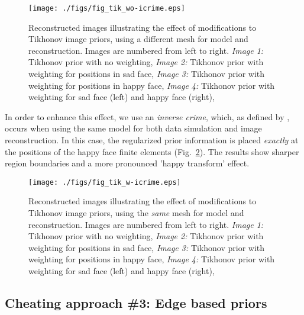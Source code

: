 \documentclass[12pt]{iopart}
\begin{document}
%
%
\begin{figure}[th]
\begin{flushright}
\texttt{[image: ./figs/fig\_tik\_wo-icrime.eps]}
\caption{\small 
Reconstructed images illustrating the effect of modifications
to Tikhonov image priors,
using a different mesh for model and reconstruction.
Images are numbered from left to right.
{\em Image 1:} Tikhonov prior with no weighting,
{\em Image 2:} Tikhonov prior with weighting for positions in sad face,
{\em Image 3:} Tikhonov prior with weighting for positions in happy face,
{\em Image 4:} Tikhonov prior with weighting for sad face (left) and
happy face (right),
 }
 \label{fig:tikprior}
\end{flushright}
\end{figure}

In order to enhance this effect, we use an {\em inverse crime},
which, as defined by \cite{Colton_and_Kress_1992}, occurs when
using the same model for both data simulation and image reconstruction.
In this case, the regularized prior information is placed
{\em exactly} at the positions of the happy face finite elements
(Fig.~\ref{fig:tikprior_icrime}). The results show sharper region boundaries
and a more pronounced 'happy transform' effect.

%
%
\begin{figure}[th]
\begin{flushright}
\texttt{[image: ./figs/fig\_tik\_w-icrime.eps]}
\caption{\small 
Reconstructed images illustrating the effect of modifications
to Tikhonov image priors,
using the {\em same} mesh for model and reconstruction.
Images are numbered from left to right.
{\em Image 1:} Tikhonov prior with no weighting,
{\em Image 2:} Tikhonov prior with weighting for positions in sad face,
{\em Image 3:} Tikhonov prior with weighting for positions in happy face,
{\em Image 4:} Tikhonov prior with weighting for sad face (left) and
happy face (right),
 }
 \label{fig:tikprior_icrime}
\end{flushright}
\end{figure}


\subsection{ Cheating approach \#3:
             Edge based priors}
\end{document}
